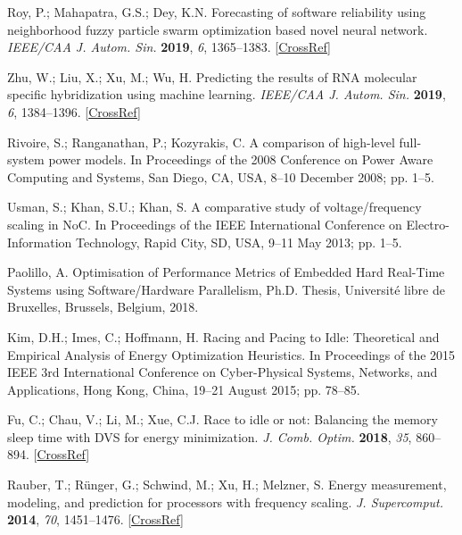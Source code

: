 \begin{thebibliography}{999}
	Roy, P.; Mahapatra, G.S.; Dey, K.N. Forecasting of software reliability using neighborhood fuzzy particle swarm optimization based novel neural network. {\em IEEE/CAA J. Autom. Sin.} {\bf 2019}, {\em 6}, 1365--1383. [\href{http://dx.doi.org/10.1109/JAS.2019.1911753}{CrossRef}]
	
	Zhu, W.; Liu, X.; Xu, M.; Wu, H. Predicting the results of RNA molecular specific hybridization using machine learning. {\em IEEE/CAA J. Autom. Sin.} {\bf 2019}, {\em 6}, 1384--1396. [\href{http://dx.doi.org/10.1109/JAS.2019.1911756}{CrossRef}]
	
	Rivoire, S.; Ranganathan, P.; Kozyrakis, C. A comparison of high-level full-system power models. {In Proceedings of the 2008 Conference on Power Aware Computing and Systems, San Diego, CA, USA, 8--10 December 2008}; pp. 1--5.
	
	Usman, S.; Khan, S.U.; Khan, S. A comparative study of voltage/frequency scaling in NoC. {In Proceedings of the  IEEE International Conference on Electro-Information Technology, Rapid City, SD, USA, 9--11 May 2013}; pp. 1--5.
	
	Paolillo, A. Optimisation of Performance Metrics of Embedded Hard Real-Time
	Systems using Software/Hardware Parallelism, Ph.D. Thesis, Université libre de Bruxelles, Brussels, Belgium, 2018.
	
	Kim, D.H.; Imes, C.; Hoffmann, H. Racing and Pacing to Idle: Theoretical and Empirical Analysis of
	Energy Optimization Heuristics. {In Proceedings of the  2015 IEEE 3rd International Conference on Cyber-Physical Systems, Networks, and Applications, Hong Kong, China, 19--21 August 2015}; pp. 78--85.
	
	Fu, C.; Chau, V.; Li, M.; Xue, C.J. Race to idle or not: Balancing the memory sleep time with DVS for energy minimization. {\em J. Comb. Optim.} {\bf 2018}, {\em 35}, 860--894. [\href{http://dx.doi.org/10.1007/s10878-017-0229-7}{CrossRef}]
	
	Rauber, T.; R{\"{u}}nger, G.; Schwind, M.; Xu, H.; Melzner, S. Energy measurement, modeling, and prediction for processors with frequency scaling. {\em J. Supercomput.} {\bf 2014}, {\em 70}, 1451--1476. [\href{http://dx.doi.org/10.1007/s11227-014-1236-4}{CrossRef}]
	

\end{thebibliography}
